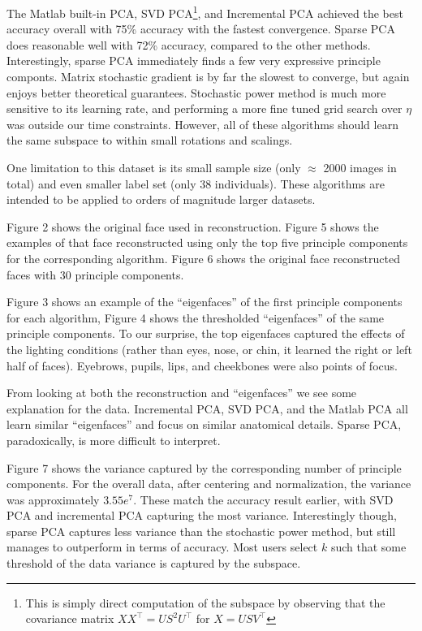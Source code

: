 \documentclass[11pt,letterpaper]{article}
\begin{document}
The Matlab built-in PCA, SVD PCA\footnote{This is simply direct computation of the subspace by observing that the covariance matrix $XX^{\top} = US^2U^\top$ for $X = USV^\top$}, and Incremental PCA achieved the best accuracy overall with 75\% accuracy with the fastest convergence. Sparse PCA does reasonable well with 72\% accuracy, compared to the other methods. Interestingly, sparse PCA immediately finds a few very expressive principle componts. Matrix stochastic gradient is by far the slowest to converge, but again enjoys better theoretical guarantees. Stochastic power method is much more sensitive to its learning rate, and performing a more fine tuned grid search over $\eta$ was outside our time constraints. However, all of these algorithms should learn the same subspace to within small rotations and scalings. 

One limitation to this dataset is its small sample size (only $\approx$ 2000 images in total) and even smaller label set (only 38 individuals). These algorithms are intended to be applied to orders of magnitude larger datasets. 

Figure 2 shows the original face used in reconstruction. Figure 5 shows the examples of that face reconstructed using only the top five principle components for the corresponding algorithm. Figure 6 shows the original face reconstructed faces with 30 principle components.

Figure 3 shows an example of the ``eigenfaces'' of the first principle components for each algorithm, Figure 4 shows the thresholded ``eigenfaces'' of the same principle components.   To our surprise, the top eigenfaces captured the effects of the lighting conditions (rather than eyes, nose, or chin, it learned the right or left half of faces). Eyebrows, pupils, lips, and cheekbones were also points of focus. 


From looking at both the reconstruction and ``eigenfaces'' we see some explanation for the data. Incremental PCA, SVD PCA, and the Matlab PCA all learn similar ``eigenfaces'' and focus on similar anatomical details. Sparse PCA, paradoxically, is more difficult to interpret. 

Figure 7 shows the variance captured by the corresponding number of principle components. For the overall data, after centering and normalization, the variance was approximately $3.55 e^7$. These match the accuracy result earlier, with SVD PCA and incremental PCA capturing the most variance. Interestingly though, sparse PCA captures less variance than the stochastic power method, but still manages to outperform in terms of accuracy. Most users select $k$ such that some threshold of the data variance is captured by the subspace.
\end{document}
